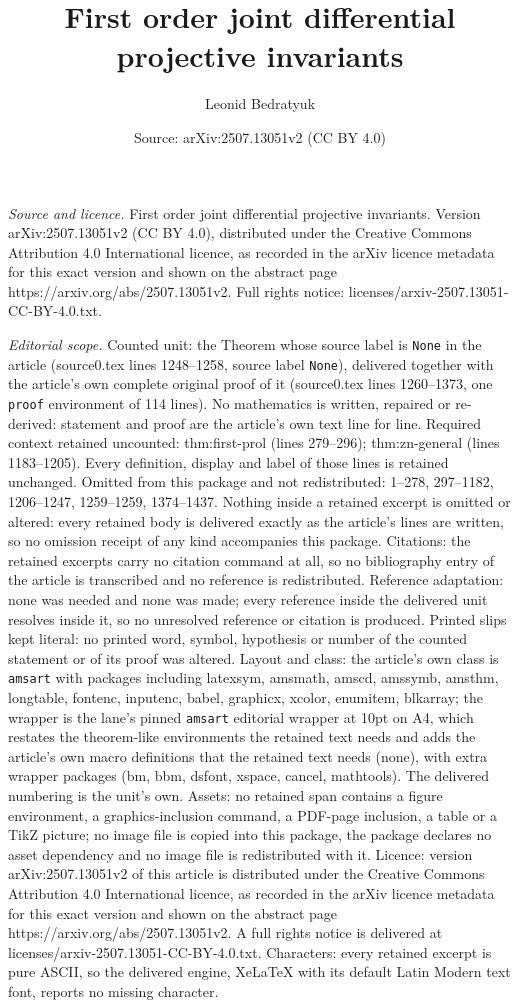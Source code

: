 \documentclass[10pt,a4paper]{amsart}
\title[First order joint differential projective invariants]{First order joint differential projective invariants}
\author{Leonid Bedratyuk}
\date{Source: arXiv:2507.13051v2 (CC BY 4.0)}
\begin{document}
\maketitle

\noindent\emph{Source and licence.} First order joint differential projective invariants. Version arXiv:2507.13051v2 (CC BY 4.0), distributed under the Creative Commons Attribution 4.0 International licence, as recorded in the arXiv licence metadata for this exact version and shown on the abstract page https://arxiv.org/abs/2507.13051v2. Full rights notice: licenses/arxiv-2507.13051-CC-BY-4.0.txt.\par\smallskip

\noindent\textit{Editorial scope.} Counted unit: the Theorem whose source label is \texttt{None} in the article (source0.tex lines 1248--1258, source label \texttt{None}), delivered together with the article's own complete original proof of it (source0.tex lines 1260--1373, one \texttt{proof} environment of 114 lines). No mathematics is written, repaired or re-derived: statement and proof are the article's own text line for line. Required context retained uncounted: thm:first-prol (lines 279--296); thm:zn-general (lines 1183--1205). Every definition, display and label of those lines is retained unchanged. Omitted from this package and not redistributed: 1--278, 297--1182, 1206--1247, 1259--1259, 1374--1437. Nothing inside a retained excerpt is omitted or altered: every retained body is delivered exactly as the article's lines are written, so no omission receipt of any kind accompanies this package. Citations: the retained excerpts carry no citation command at all, so no bibliography entry of the article is transcribed and no reference is redistributed. Reference adaptation: none was needed and none was made; every reference inside the delivered unit resolves inside it, so no unresolved reference or citation is produced. Printed slips kept literal: no printed word, symbol, hypothesis or number of the counted statement or of its proof was altered. Layout and class: the article's own class is \texttt{amsart} with packages including latexsym, amsmath, amscd, amssymb, amsthm, longtable, fontenc, inputenc, babel, graphicx, xcolor, enumitem, blkarray; the wrapper is the lane's pinned \texttt{amsart} editorial wrapper at 10pt on A4, which restates the theorem-like environments the retained text needs and adds the article's own macro definitions that the retained text needs (none), with extra wrapper packages (bm, bbm, dsfont, xspace, cancel, mathtools). The delivered numbering is the unit's own. Assets: no retained span contains a figure environment, a graphics-inclusion command, a PDF-page inclusion, a table or a TikZ picture; no image file is copied into this package, the package declares no asset dependency and no image file is redistributed with it. Licence: version arXiv:2507.13051v2 of this article is distributed under the Creative Commons Attribution 4.0 International licence, as recorded in the arXiv licence metadata for this exact version and shown on the abstract page https://arxiv.org/abs/2507.13051v2. A full rights notice is delivered at licenses/arxiv-2507.13051-CC-BY-4.0.txt. Characters: every retained excerpt is pure ASCII, so the delivered engine, XeLaTeX with its default Latin Modern text font, reports no missing character.
\end{document}
